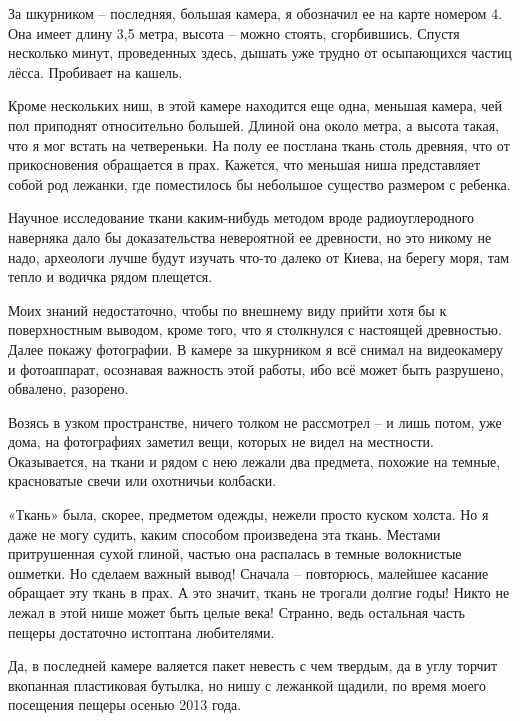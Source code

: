 
За шкурником – последняя, большая камера, я обозначил ее на карте номером 4. Она имеет длину 3,5 метра, высота – можно стоять, сгорбившись. Спустя несколько минут, проведенных здесь, дышать уже трудно от осыпающихся частиц лёсса. Пробивает на кашель.

Кроме нескольких ниш, в этой камере находится еще одна, меньшая камера, чей пол приподнят относительно большей. Длиной она около метра, а высота такая, что я мог встать на четвереньки. На полу ее постлана ткань столь древняя, что от прикосновения обращается в прах. Кажется, что меньшая ниша представляет собой род лежанки, где поместилось бы небольшое существо размером с ребенка.

Научное исследование ткани каким-нибудь методом вроде радиоуглеродного наверняка дало бы доказательства невероятной ее древности, но это никому не надо, археологи лучше будут изучать что-то далеко от Киева, на берегу моря, там тепло и водичка рядом плещется.

Моих знаний недостаточно, чтобы по внешнему виду прийти хотя бы к поверхностным выводом, кроме того, что я столкнулся с настоящей древностью. Далее покажу фотографии. В камере за шкурником я всё снимал на видеокамеру и фотоаппарат, осознавая важность этой работы, ибо всё может быть разрушено, обвалено, разорено.

Возясь в узком пространстве, ничего толком не рассмотрел – и лишь потом, уже дома, на фотографиях заметил вещи, которых не видел на местности. Оказывается, на ткани и рядом с нею лежали два предмета, похожие на темные, красноватые свечи или охотничьи колбаски.

«Ткань» была, скорее, предметом одежды, нежели просто куском холста. Но я даже не могу судить, каким способом произведена эта ткань. Местами притрушенная сухой глиной, частью она распалась в темные волокнистые ошметки. Но сделаем важный вывод! Сначала – повторюсь, малейшее касание обращает эту ткань в прах. А это значит, ткань не трогали долгие годы! Никто не лежал в этой нише может быть целые века! Странно, ведь остальная часть пещеры достаточно истоптана любителями.

Да, в последней камере валяется пакет невесть с чем твердым, да в углу торчит вкопанная пластиковая бутылка, но нишу с лежанкой щадили, по время моего посещения пещеры осенью 2013 года.
 
